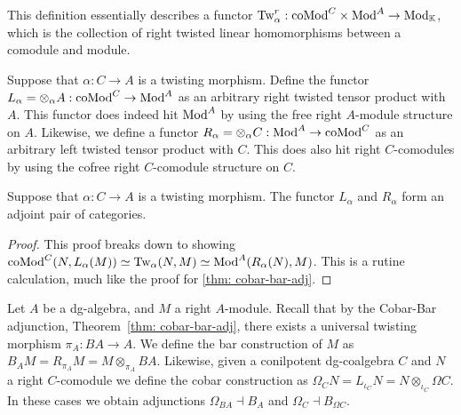 \documentclass[../thesis.tex]{subfiles}
\begin{document}
            This definition essentially describes a functor $\tt{Tw}_\alpha^r : \tt{coMod}^C \times \tt{Mod}^A \rightarrow \tt{Mod}_\mathbb{K}$, which is the collection of right twisted linear homomorphisms between a comodule and module.

            Suppose that $\alpha : C \rightarrow A$ is a twisting morphism. Define the functor $L_\alpha = \otimes_\alpha A : \tt{coMod}^C \rightarrow \tt{Mod}^A$ as an arbitrary right twisted tensor product with $A$. This functor does indeed hit $\tt{Mod}^A$ by using the free right $A$-module structure on $A$. Likewise, we define a functor $R_\alpha = \otimes_\alpha C : \tt{Mod}^A \rightarrow \tt{coMod}^C$ as an arbitrary left twisted tensor product with $C$. This does also hit right $C$-comodules by using the cofree right $C$-comodule structure on $C$.

            \begin{proposition}
                Suppose that $\alpha : C \rightarrow A$ is a twisting morphism. The functor $L_\alpha$ and $R_\alpha$ form an adjoint pair of categories.
                \begin{center}
                \end{center}
            \end{proposition}

            \begin{proof}
                This proof breaks down to showing $\tt{coMod}^C(N, L_\alpha(M))\simeq \tt{Tw}_\alpha(N,M) \simeq \tt{Mod}^A(R_\alpha(N),M)$. This is a rutine calculation, much like the proof for \ref{thm: cobar-bar-adj}.
            \end{proof}

            Let $A$ be a dg-algebra, and $M$ a right $A$-module. Recall that by the Cobar-Bar adjunction, Theorem~\ref{thm: cobar-bar-adj}, there exists a universal twisting morphism $\pi_A : BA \rightarrow A$. We define the bar construction of $M$ as $B_AM = R_{\pi_A}M = M\otimes_{\pi_A}BA$. Likewise, given a conilpotent dg-coalgebra $C$ and $N$ a right $C$-comodule we define the cobar construction as $\Omega_CN = L_{\iota_C}N = N\otimes_{\iota_C}\Omega C$. In these cases we obtain adjunctions $\Omega_{BA} \dashv B_A$ and $\Omega_C \dashv B_{\Omega C}$.
\end{document}
